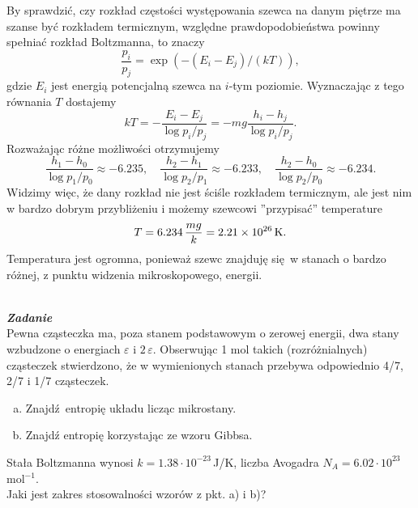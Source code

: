 \documentclass[11pt,a4paper]{article}
\newcounter{zadanie}\newcommand{\zadanie}[1][]{\addtocounter{zadanie}{1} ~\\  {\bf \emph{Zadanie \arabic{zadanie} #1 }} \\}
\begin{document}
By sprawdzić, czy rozkład częstości występowania szewca na danym piętrze ma szanse być rozkładem termicznym, względne prawdopodobieństwa powinny spełniać rozkład Boltzmanna, to znaczy
\begin{equation}
	\frac{p_i}{p_j} = \exp\left( - (E_i - E_j)/ (k T)\right),
\end{equation}
gdzie $E_i$ jest energią potencjalną szewca na $i$-tym poziomie. Wyznaczając z tego równania $T$ dostajemy
\begin{equation}
	kT = - \frac{E_i - E_j}{\log p_i / p_j} = - mg \frac{h_i - h_j}{\log p_i/p_j}.
\end{equation}
Rozważając różne możliwości otrzymujemy
\begin{equation}
	\frac{h_1- h_0}{\log p_1/p_0} \approx - 6.235, \quad \frac{h_2- h_1}{\log p_2/p_1} \approx -6.233, \quad \frac{h_2- h_0}{\log p_2/p_0} \approx -6.234.
\end{equation}
Widzimy więc, że dany rozkład nie jest ściśle rozkładem termicznym, ale jest nim w bardzo dobrym przybliżeniu i możemy szewcowi ''przypisać'' temperature
\begin{equation}
	T = 6.234\, \frac{m g}{k} = 2.21 \times 10^{26}\,{\rm K}.
\end{equation}
Temperatura jest ogromna, ponieważ szewc znajduję się w stanach o bardzo różnej, z punktu widzenia mikroskopowego, energii.

\newpage


\zadanie
Pewna cząsteczka ma, poza stanem podstawowym o zerowej energii, dwa stany wzbudzone o energiach $\varepsilon$ i $2\,\varepsilon$.
Obserwując 1 mol takich (rozróżnialnych) cząsteczek stwierdzono, że w wymienionych stanach przebywa odpowiednio 4/7, 2/7 i 1/7 cząsteczek.
\begin{enumerate}[a)]
\item Znajdź entropię układu licząc mikrostany. 
\item Znajdź entropię korzystając ze wzoru Gibbsa.
\end{enumerate}
Stała Boltzmanna wynosi $k = 1.38\cdot 10^{-23}\,$J/K, 
liczba Avogadra $N_A=6.02\cdot 10^{23}$\, mol$^{-1}$. \\
Jaki jest zakres stosowalności wzorów z pkt. a) i b)?
\end{document}
